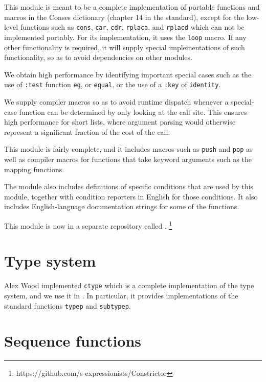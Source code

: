 This module is meant to be a complete implementation of portable
functions and macros in the Conses dictionary (chapter 14 in the
\commonlisp{} standard), except for the low-level functions such as
\texttt{cons}, \texttt{car}, \texttt{cdr}, \texttt{rplaca}, and
\texttt{rplacd} which can not be implemented portably.  For its
implementation, it uses the \texttt{loop} macro.  If any other
functionality is required, it will supply special implementations of
such functionality, so as to avoid dependencies on other modules.

We obtain high performance by identifying important special
cases such as the use of \texttt{:test} function \texttt{eq}, or
\texttt{equal}, or the use of a \texttt{:key} of \texttt{identity}.

We supply compiler macros so as to avoid runtime dispatch whenever a
special-case function can be determined by only looking at the call
site.  This ensures high performance for short lists, where argument
parsing would otherwise represent a significant fraction of the cost
of the call.

This module is fairly complete, and it includes macros such as
\texttt{push} and \texttt{pop} as well as compiler macros for
functions that take keyword arguments such as the mapping functions. 

The module also includes definitions of specific conditions that are
used by this module, together with condition reporters in English for
those conditions.  It also includes English-language documentation
strings for some of the functions. 

This module is now in a separate repository called \constrictor{}.%
\footnote{https://github.com/s-expressionists/Constrictor}

\section{Type system}
\label{sec-type-system}

Alex Wood implemented \texttt{ctype} which is a complete
implementation of the \commonlisp{} type system, and we use it in
\sysname{}.  In particular, it provides implementations of the
standard functions \texttt{typep} and \texttt{subtypep}.

\section{Sequence functions}
\label{sec-sequence-functions}

